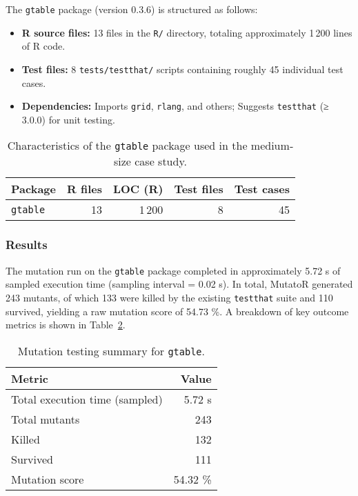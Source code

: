 The \texttt{gtable} package (version 0.3.6) is structured as follows:

\begin{itemize}
  \item \textbf{R source files:} 13 files in the \texttt{R/} directory, totaling approximately 1\,200 lines of R code.
  \item \textbf{Test files:} 8 \texttt{tests/testthat/} scripts containing roughly 45 individual test cases.
  \item \textbf{Dependencies:} Imports \texttt{grid}, \texttt{rlang}, and others; Suggests \texttt{testthat} (≥ 3.0.0) for unit testing.
\end{itemize}

\begin{table}[htbp]
  \centering
  \begin{tabular}{lrrrr}
    \hline\hline
    Package & R files & LOC (R) & Test files & Test cases \\
    \hline
    \texttt{gtable} & 13 & 1\,200 & 8 & 45 \\
    \hline
  \end{tabular}
  \caption{Characteristics of the \texttt{gtable} package used in the medium‐size case study.}
  \label{tab:gtable-metrics}
\end{table}

\subsubsection{Results}

The mutation run on the \texttt{gtable} package completed in approximately 5.72 s of sampled execution time (sampling interval = 0.02 s).  In total, MutatoR generated 243 mutants, of which 133 were killed by the existing \texttt{testthat} suite and 110 survived, yielding a raw mutation score of 54.73 \%.  A breakdown of key outcome metrics is shown in Table~\ref{tab:gtable-summary}.

\begin{table}[htbp]
  \centering
  \begin{tabular}{lr}
    \hline\hline
    Metric & Value \\
    \hline
    Total execution time (sampled) & 5.72 s \\
    Total mutants & 243 \\
    Killed & 132 \\
    Survived & 111 \\
    Mutation score & 54.32 \% \\
    \hline
  \end{tabular}
  \caption{Mutation testing summary for \texttt{gtable}.}
  \label{tab:gtable-summary}
\end{table}

